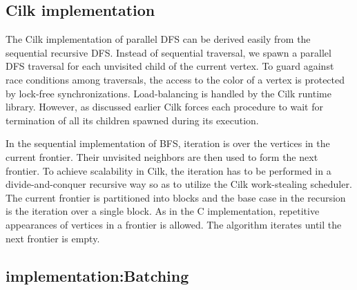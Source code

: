\subsection{Cilk implementation}

The Cilk implementation of parallel DFS can be derived easily from the
sequential recursive DFS. Instead of sequential traversal, we spawn a
parallel DFS traversal for each unvisited child of the
current vertex. To guard against race conditions among traversals, the
access to the color of a vertex is protected by lock-free
synchronizations. Load-balancing is handled by the Cilk runtime
library. However, as discussed earlier Cilk forces each procedure to
wait for termination of all its children spawned during its execution.

In the sequential implementation of BFS, iteration is over the
vertices in the current frontier. Their unvisited neighbors are then
used to form the next frontier. To achieve scalability in Cilk, the
iteration has to be performed in a divide-and-conquer recursive way so
as to utilize the Cilk work-stealing scheduler. The current frontier
is partitioned into blocks and the base case in the recursion is the
iteration over a single block. As in the C implementation, repetitive
appearances of vertices in a frontier is allowed. The algorithm
iterates until the next frontier is empty.


\subsection{\XWS{} implementation:Batching}\label{sec:Performance}
%
%

